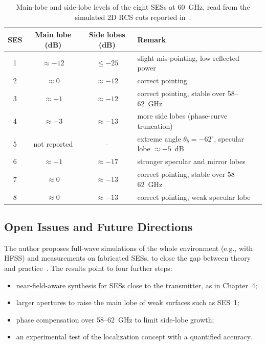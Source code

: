 \begin{table}[!htbp]
    \centering
    \caption[Simulated performance of the eight SESs at 60 GHz]{Main-lobe and side-lobe levels of the eight SESs at 60~GHz, read from the simulated 2D RCS cuts reported in~\cite{Sabato2025}.}
    \label{tab:ch5-ses}
    \small
    \begin{tabularx}{\textwidth}{c c c >{\raggedright\arraybackslash}X}
        \toprule
        SES & Main lobe (dB) & Side lobes (dB) & Remark \\
        \midrule
        1 & $\approx -12$ & $\leq -25$ & slight mis-pointing, low reflected power \\
        2 & $\approx 0$ & $\approx -12$ & correct pointing \\
        3 & $\approx +1$ & $\approx -12$ & correct pointing, stable over 58--62~GHz \\
        4 & $\approx -3$ & $\approx -13$ & more side lobes (phase-curve truncation) \\
        5 & not reported & -- & extreme angle $\theta_b = -62^\circ$, specular lobe $\approx -5$~dB \\
        6 & $\approx -1$ & $\approx -17$ & stronger specular and mirror lobes \\
        7 & $\approx 0$ & $\approx -13$ & correct pointing, stable over 58--62~GHz \\
        8 & $\approx 0$ & $\approx -13$ & correct pointing, weak specular lobe \\
        \bottomrule
    \end{tabularx}
\end{table}

\subsection{Open Issues and Future Directions}
The author proposes full-wave simulations of the whole environment (e.g., with HFSS) and measurements on fabricated SESs, to close the gap between theory and practice~\cite{Sabato2025}. The results point to four further steps:
\begin{itemize}
    \item near-field-aware synthesis for SESs close to the transmitter, as in Chapter~4;
    \item larger apertures to raise the main lobe of weak surfaces such as SES~1;
    \item phase compensation over 58--62~GHz to limit side-lobe growth;
    \item an experimental test of the localization concept with a quantified accuracy.
\end{itemize}
